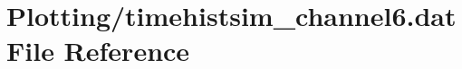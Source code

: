 \hypertarget{Plotting_2timehistsim__channel6_8dat}{}\section{Plotting/timehistsim\+\_\+channel6.dat File Reference}
\label{Plotting_2timehistsim__channel6_8dat}
